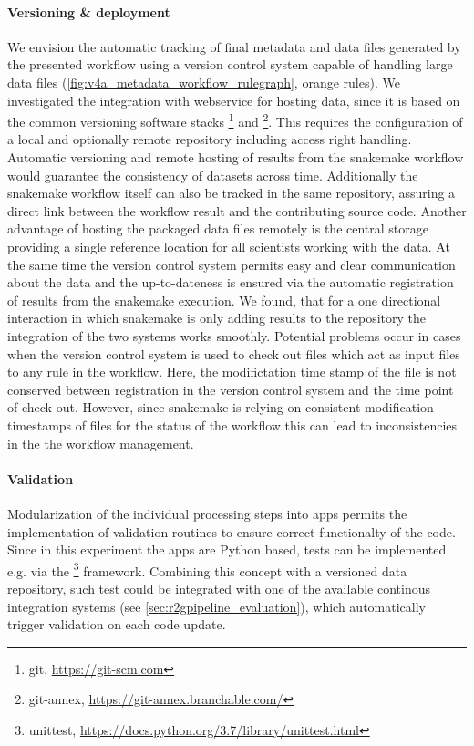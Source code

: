 \paragraph{Versioning \& deployment}
We envision the automatic tracking of final metadata and data files generated by the presented workflow using a version control system capable of handling large data files (\cref{fig:v4a_metadata_workflow_rulegraph}, orange rules). We investigated the integration with  webservice for hosting data, since it is based on the common versioning software stacks \footnote{git, \url{https://git-scm.com}} and \footnote{git-annex, \url{https://git-annex.branchable.com/}}. This requires the configuration of a local and optionally remote repository including access right handling. Automatic versioning and remote hosting of results from the snakemake workflow would guarantee the consistency of datasets across time. Additionally the snakemake workflow itself can also be tracked in the same repository, assuring a direct link between the workflow result and the contributing source code.
Another advantage of hosting the packaged data files remotely is the central storage providing a single reference location for all scientists working with the data. At the same time the version control system permits easy and clear communication about the data and the up-to-dateness is ensured via the automatic registration of results from the snakemake execution.
We found, that for a one directional interaction in which snakemake is only adding results to the repository the integration of the two systems works smoothly. Potential problems occur in cases when the version control system is used to check out files which act as input files to any rule in the workflow. Here, the modifictation time stamp of the file is not conserved between registration in the version control system and the time point of check out. However, since snakemake is relying on consistent modification timestamps of files for the status of the workflow this can lead to inconsistencies in the the workflow management.

\paragraph{Validation}
Modularization of the individual processing steps into apps permits the implementation of validation routines to ensure correct functionalty of the code. Since in this experiment the apps are Python based, tests can be implemented e.g. via the \footnote{unittest, \url{https://docs.python.org/3.7/library/unittest.html}} framework. Combining this concept with a versioned data repository, such test could be integrated with one of the available continous integration systems (see \cref{sec:r2gpipeline_evaluation}), which automatically trigger validation on each code update.

